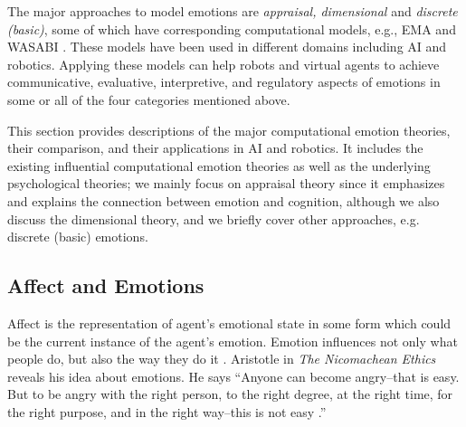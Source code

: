 \documentclass[12pt]{report}
\begin{document}
The major approaches to model emotions are \textit{appraisal, dimensional} and
\textit{discrete (basic)}, some of which have corresponding computational
models, e.g., EMA \cite{marsella:ema-process-model} and WASABI
\cite{becker:wasabi,becker:wasabi-description}. These models have been used in
different domains including AI and robotics. Applying these models can help
robots and virtual agents to achieve communicative, evaluative, interpretive,
and regulatory aspects of emotions in some or all of the four categories
mentioned above.

This section provides descriptions of the major computational emotion theories,
their comparison, and their applications in AI and robotics. It includes the
existing influential computational emotion theories as well as the underlying
psychological theories; {\color{red}we mainly focus on appraisal theory since it
emphasizes and explains the connection between emotion and cognition, although we also
discuss the dimensional theory, and we briefly cover other approaches, e.g.
discrete (basic) emotions.}

\subsection{Affect and Emotions}
{\color{red} Affect is the representation of agent's emotional state in
some form which could be the current instance of the agent's emotion.} Emotion
influences not only what people do, but also the way they do it
\cite{cowie:concepts-definitions}. Aristotle in \emph{The Nicomachean Ethics}
reveals his idea about emotions. He says ``Anyone can become angry--that is
easy. But to be angry with the right person, to the right degree, at the right
time, for the right purpose, and in the right way--this is not easy
\cite{aristotle:ethics}.''
\end{document}
